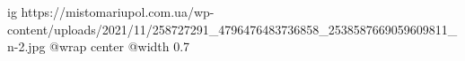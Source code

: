 
 
 
 
 

\ifcmt
  ig https://mistomariupol.com.ua/wp-content/uploads/2021/11/258727291_4796476483736858_2538587669059609811_n-2.jpg
  @wrap center
  @width 0.7
\fi
